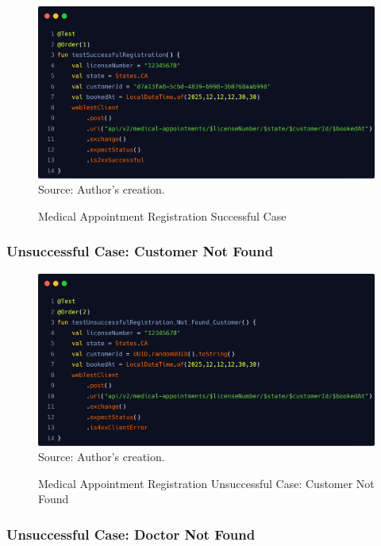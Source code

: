 \begin{figure}[H]
	\centering
	\caption{Medical Appointment Registration Successful Case}
	\includegraphics[width=1\linewidth]{figures/medical_appointment_registration_integration_test_successful_case.png}
	\label{fig:medical_appointment_registration_integration_test_successful_case}
	\footnotesize Source: Author's creation.
\end{figure}

\subsubsection{Unsuccessful Case: Customer Not Found}

\begin{figure}[H]
	\centering
	\caption{Medical Appointment Registration Unsuccessful Case: Customer Not Found}
	\includegraphics[width=1\linewidth]{figures/medical_appointment_registration_integration_test_unsuccessful_case_customer_not_found.png}
	\label{fig:medical_appointment_registration_integration_test_unsuccessful_case_customer_not_found}
	\footnotesize Source: Author's creation.
\end{figure}

\subsubsection{Unsuccessful Case: Doctor Not Found}

